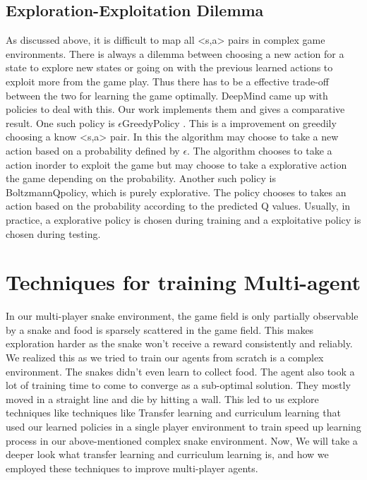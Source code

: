 \documentclass[conference,10pt]{IEEEtran}
\begin{document}
	\subsection{Exploration-Exploitation Dilemma}
	As discussed above, it is difficult to map all <s,a> pairs in complex game environments. There is always a dilemma between choosing a new action for a state to explore new states or going on with the previous learned actions to exploit more from the game play. Thus there has to be a effective trade-off between the two for learning the game optimally. DeepMind came up with policies to deal with this. Our work implements them and gives a comparative result.
	\break
	\break
	One such policy is \( \epsilon \)GreedyPolicy . This is a improvement on greedily choosing a know <s,a> pair. In this the algorithm may choose to take a new action based on a probability defined by  \( \epsilon \). The algorithm chooses to take a action inorder to exploit the game but may choose to take a explorative action the game depending on the probability.
	\break
	\break
	Another such policy is BoltzmannQpolicy, which is purely explorative. The policy chooses to takes an action based on the probability according to the predicted Q values.
	\break
	\break
	Usually, in practice, a explorative policy is chosen during training and a exploitative policy is chosen during testing.


	\section{Techniques for training Multi-agent}
	  In our multi-player snake environment,  the game field is only partially observable by a snake and food is sparsely scattered in the game field. This makes exploration harder as the snake won't receive a reward consistently and reliably. We realized this as we tried to train our agents from scratch is a complex environment. The snakes
	didn't even learn to collect food. The agent also took a lot of training time to come to converge as a sub-optimal solution. They mostly moved in a straight line and die by hitting a wall. This led to us explore techniques like techniques like Transfer learning and curriculum learning that used our learned policies in a single player environment to train speed up learning process in our above-mentioned complex snake environment. Now, We will take a deeper look what transfer learning and curriculum learning is, and how we employed these techniques to improve multi-player agents.
\end{document}
